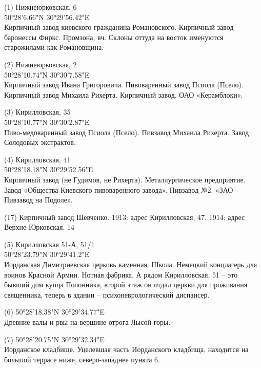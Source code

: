 \begin{flushleft}
(1) Нижнеюрковская, 6\\
 50°28'6.66"N 30°29'56.42"E\\
Кирпичный завод киевского гражданина Романовского. Кирпичный завод баронессы Фиркс. Промзона, вч. Склоны оттуда на восток именуются старожилами как Романовщина.

\medskip

(2) Нижнеюрковская, 2\\
50°28'10.74"N 30°30'7.58"E\\ Кирпичный завод Ивана Григоровича. Пивоваренный завод Псиола (Псело). Кирпичный завод Михаила Рихерта. Кирпичный завод. ОАО «Керамблоки».

\medskip

(3) Кирилловская, 35\\
50°28'10.77"N 30°30'2.87"E\\ Пиво-медоваренный завод Псиола (Псело). Пивзавод Михаила Рихерта. Завод Солодовых экстрактов.

\medskip

(4) Кирилловская, 41\\
50°28'18.18"N 30°29'52.56"E\\ Кирпичный завод (не Гудимов, не Рихерта). Металлургическое предприятие. Завод «Общества Киевского пивоваренного завода». Пивзавод №2. «ЗАО Пивзавод на Подоле».

\medskip

(17) Кирпичный завод Шевченко. 1913: адрес Кирилловская, 47. 1914: адрес Верхне-Юрковская, 14
\medskip
 
(5) Кирилловская 51-А, 51/1\\
50°28'23.79"N 30°29'41.2"E\\ Иорданская Димитриевская церковь каменная. Школа. Немецкий концлагерь для воинов Красной Армии. Нотная фабрика. А рядом Кирилловская, 51 – это бывший дом купца Полонника, второй этаж он отдал церкви для проживания священника, теперь в здании – психоневрологический диспансер.\\

\medskip

(6) 50°28'18.38"N 30°29'34.77"E\\
Древние валы и рвы на вершине отрога Лысой горы.\\

\medskip

(7) 50°28'20.75"N 30°29'32.34"E\\
Иорданское кладбище. Уцелевшая часть Иорданского кладбища, находится на большой террасе ниже, северо-западнее пункта 6.\\


\end{flushleft}
